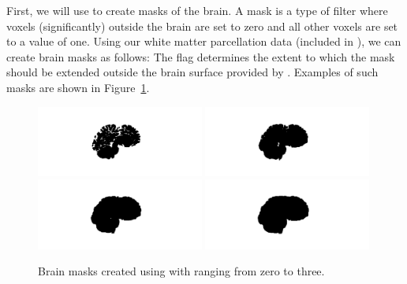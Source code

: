 First, we will use \freesurfer{} to create masks of the brain. A mask
is a type of filter where voxels (significantly) outside the brain are
set to zero and all other voxels are set to a value of one. Using our
white matter parcellation data (included in
), we can create brain masks as
follows:
\noindent The  flag determines the extent to which the
mask should be extended outside the brain surface provided by
. Examples of such masks are shown in
Figure~\ref{fig:chp5:masks}.
\begin{figure}	
\begin{center}
  \includegraphics[trim=400 130 500 150,clip,width=0.49\textwidth]{./graphics/chp5/mask0.png}
\includegraphics[trim=400 130 500 150,clip,width=0.49\textwidth]{./graphics/chp5/mask1.png} \\
\includegraphics[trim=400 130 500 150,clip,width=0.49\textwidth]{./graphics/chp5/mask2.png}
\includegraphics[trim=400 130 500 150,clip,width=0.49\textwidth]{./graphics/chp5/mask3.png}
\end{center}
\caption{
  Brain masks created using  with  ranging from zero to three.
}
\label{fig:chp5:masks}
\end{figure}

